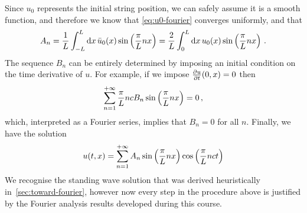 Since $u_0$ represents the initial string position, we can safely assume it is a smooth
function, and therefore we know that \cref{eq:u0-fourier} converges uniformly, and that
\begin{equation}
  A_n=\frac{1}{L}\int_{-L}^L\mathrm{d} x\,\bar{u}_0(x)\sin\left(\frac{\pi }{L}nx\right)
  =\frac{2}{L}\int_{0}^L\mathrm{d} x\,u_0(x)\sin\left(\frac{\pi }{L}nx\right)\,.
\end{equation}
The sequence $B_n$ can be entirely determined by imposing an initial condition on the time
derivative of $u$. For example, if we impose $\frac{\partial u}{\partial t}(0,x)=0$ then
\begin{equation}
  \sum_{n=1}^{+\infty}\frac{\pi}{L}ncB_n\sin\left(\frac{\pi }{L}nx\right)=0\,,
\end{equation}
which, interpreted as a Fourier series, implies that $B_n=0$ for all $n$. Finally, we have
the solution
\begin{equation}
  u(t,x)=\sum_{n=1}^{+\infty}A_n\sin\left(\frac{\pi }{L}nx\right)\cos\left(\frac{\pi}{L}nct\right)
\end{equation}
We recognise the standing wave solution that was derived heuristically
in~\cref{sec:toward-fourier}, however now every step in the procedure above is justified
by the Fourier analysis results developed during this course.
